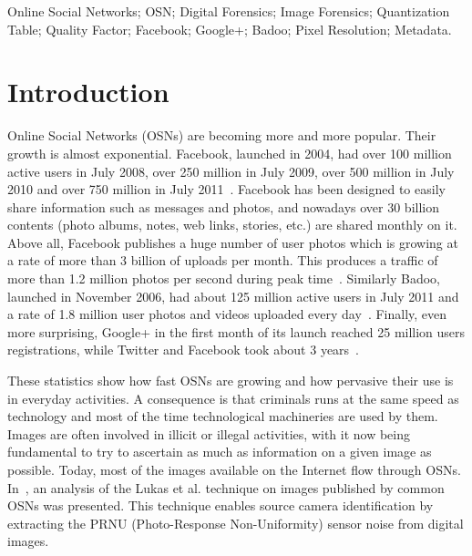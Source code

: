 \documentclass[10pt, conference]{IEEEtran}
\begin{document}
\begin{IEEEkeywords}
Online Social Networks; OSN; Digital Forensics; Image Forensics; Quantization Table; Quality Factor; Facebook; Google+; Badoo; Pixel Resolution; Metadata.

\end{IEEEkeywords}

\section{Introduction}

Online Social Networks (OSNs) are becoming more and more popular. Their growth is almost exponential. Facebook, launched in 2004, had over 100 million active users in July 2008, over 250 million in July 2009, over 500 million in July 2010 and over 750 million in July 2011~\cite{facebookstats}. Facebook has been designed to easily share information such as messages and photos, and nowadays over 30 billion contents (photo albums, notes, web links, stories, etc.) are shared monthly on it. Above all, Facebook publishes a huge number of user photos which is growing at a rate of more than 3 billion of uploads per month. This produces a traffic of more than 1.2 million photos per second during peak time~\cite{pingdom}.
Similarly Badoo, launched in November 2006, had about 125 million active users  in July 2011 and a rate of 1.8 million user photos and videos uploaded every day~\cite{badoo}.
Finally, even more surprising, Google+ in the first month of its launch reached 25 million users registrations, while Twitter and Facebook took about 3 years~\cite{gplus}.

These statistics show how fast OSNs are growing and how pervasive their use is in everyday activities. A consequence is that criminals runs at the same speed as technology and most of the time technological machineries are used by them. Images are often involved in illicit or illegal activities, with it now being fundamental to try to ascertain as much as information on a given image as possible. Today, most of the images available on the Internet flow through OSNs.
In~\cite{SCI_AIHC2011}, an analysis of the Lukas et al. \cite{Lukas06} technique on images published by common OSNs was presented. This technique enables source camera identification by extracting the PRNU (Photo-Response Non-Uniformity) sensor noise from digital images.
\end{document}
